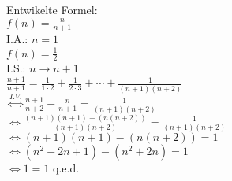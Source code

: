 \documentclass[12pt]{scrreprt} %
\begin{document}
Entwikelte Formel:\\
$f(n) = \frac{n}{n+1}$\\
I.A.: $n = 1$\\
$f(n) = \frac{1}{2}$
\hfill\checkmark
\\
I.S.: $n \to n+1$\\
$\frac{n+1}{n+1} = \frac{1}{1 \cdot 2} + \frac{1}{2 \cdot 3} + \cdots + \frac{1}{(n+1)(n+2)}$\\
$\overset{I.V.}{\Leftrightarrow} \frac{n+1}{n+2} - \frac{n}{n+1} = \frac{1}{(n+1)(n+2)}$\\
$\Leftrightarrow \frac{(n+1)(n+1) - (n(n+2))}{(n+1)(n+2)} = \frac{1}{(n+1)(n+2)}$\\
$\Leftrightarrow (n+1)(n+1) - (n(n+2)) = 1$\\
$\Leftrightarrow (n^2+2n+1) - (n^2+2n) = 1$\\
$\Leftrightarrow 1 = 1$
\hfill{\calligra q.e.d.}
\end{document}
